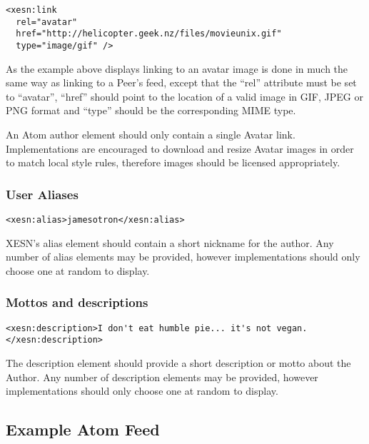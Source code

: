\documentclass[titlepage,english,a4paper,twoside,dvips]{article}
\begin{document}
\begin{verbatim}
<xesn:link 
  rel="avatar"
  href="http://helicopter.geek.nz/files/movieunix.gif"
  type="image/gif" />
\end{verbatim}

As the example above displays linking to an avatar image is done in much the same way as linking to a Peer's feed, except that the ``rel'' attribute must be set to ``avatar'', ``href'' should point to the location of a valid image in GIF, JPEG or PNG format and ``type'' should be the corresponding MIME type.

An Atom author element should only contain a single Avatar link.  Implementations are encouraged to download and resize Avatar images in order to match local style rules, therefore images should be licensed appropriately.

\subsubsection{User Aliases}

\begin{verbatim}
<xesn:alias>jamesotron</xesn:alias>
\end{verbatim}

XESN's alias element should contain a short nickname for the author.  Any number of alias elements may be provided, however implementations should only choose one at random to display.


\subsubsection{Mottos and descriptions}

\begin{verbatim}
<xesn:description>I don't eat humble pie... it's not vegan.</xesn:description>
\end{verbatim}

The description element should provide a short description or motto about the Author.  Any number of description elements may be provided, however implementations should only choose one at random to display.

\subsection{Example Atom Feed}
\end{document}
